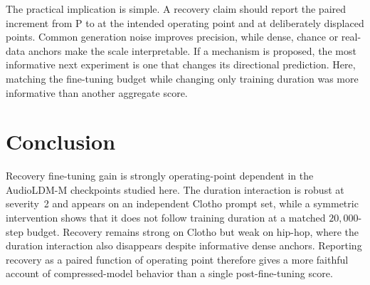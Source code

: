 The practical implication is simple. A recovery claim should report the paired increment from P to \PFT{} at the intended operating point and at deliberately displaced points. Common generation noise improves precision, while dense, chance or real-data anchors make the scale interpretable. If a mechanism is proposed, the most informative next experiment is one that changes its directional prediction. Here, matching the fine-tuning budget while changing only training duration was more informative than another aggregate score.

\section{Conclusion}
Recovery fine-tuning gain is strongly operating-point dependent in the AudioLDM-M checkpoints studied here. The duration interaction is robust at severity~2 and appears on an independent Clotho prompt set, while a symmetric intervention shows that it does not follow training duration at a matched $20{,}000$-step budget. Recovery remains strong on Clotho but weak on hip-hop, where the duration interaction also disappears despite informative dense anchors. Reporting recovery as a paired function of operating point therefore gives a more faithful account of compressed-model behavior than a single post-fine-tuning score.

